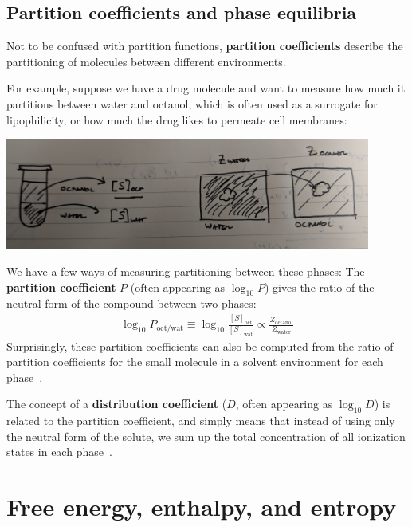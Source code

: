 \documentclass[english,course]{lecture}
\begin{document}
\subsection{Partition coefficients and phase equilibria}

Not to be confused with partition functions, {\bf partition coefficients} describe the partitioning of molecules between different environments.

For example, suppose we have a drug molecule and want to measure how much it partitions between water and octanol, which is often used as a surrogate for lipophilicity, or how much the drug likes to permeate cell membranes:

\begin{centering}
\includegraphics[width=0.9\textwidth]{figures/octanol-water-partitioning.jpg}

\end{centering}

We have a few ways of measuring partitioning between these phases: 
The {\bf partition coefficient} $P$ (often appearing as $\log_{10} P$) gives the ratio of the neutral form of the compound between two phases:
\begin{eqnarray}
\log_{10} P_\mathrm{oct/wat} \equiv \log_{10}\frac{[S]_\mathrm{oct}}{[S]_\mathrm{wat}} \propto \frac{Z_\mathrm{octanol}}{Z_\mathrm{water}}
\end{eqnarray}
Surprisingly, these partition coefficients can also be computed from the ratio of partition coefficients for the small molecule in a solvent environment for each phase~\cite{bannan2016calculating}.

The concept of a {\bf distribution coefficient} ($D$, often appearing as $\log_{10} D$) is related to the partition coefficient, and simply means that instead of using only the neutral form of the solute, we sum up the total concentration of all ionization states in each phase~\cite{rustenburg2016measuring}.

\section{Free energy, enthalpy, and entropy}
\end{document}
